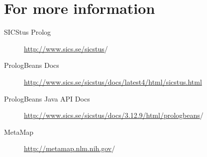 \documentclass[11pt]{article}
\begin{document}
\section{For more information}
\label{For more information}
\begin{description}
\item[SICStus Prolog]  \url{http://www.sics.se/sicstus}/
\item[PrologBeans Docs]  \url{http://www.sics.se/sicstus/docs/latest4/html/sicstus.html}
\item[PrologBeans Java API Docs]  \url{http://www.sics.se/sicstus/docs/3.12.9/html/prologbeans}/
\item[MetaMap]  \url{http://metamap.nlm.nih.gov}/
\end{description}
\end{document}
